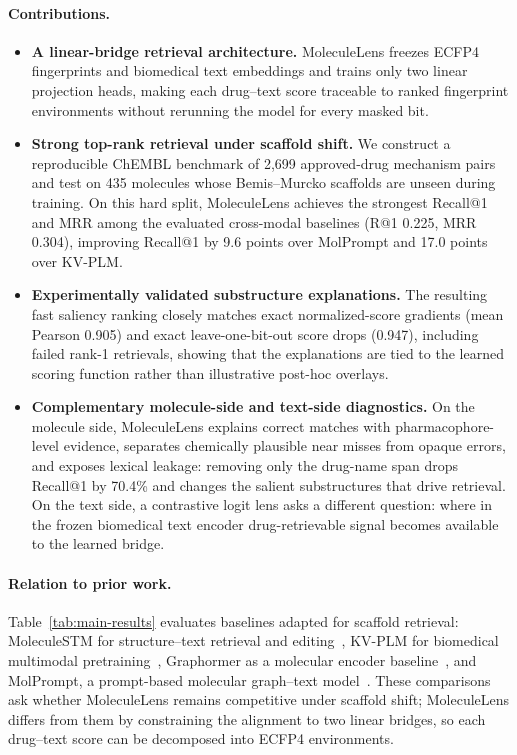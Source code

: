 \documentclass{article}
\begin{document}
\paragraph{Contributions.}
\begin{itemize}
\item \textbf{A linear-bridge retrieval architecture.} MoleculeLens freezes ECFP4 fingerprints and biomedical text embeddings and trains only two linear projection heads, making each drug--text score traceable to ranked fingerprint environments without rerunning the model for every masked bit.
\item \textbf{Strong top-rank retrieval under scaffold shift.} We construct a reproducible ChEMBL benchmark of 2,699 approved-drug mechanism pairs and test on 435 molecules whose Bemis--Murcko scaffolds are unseen during training. On this hard split, MoleculeLens achieves the strongest Recall@1 and MRR among the evaluated cross-modal baselines (R@1 0.225, MRR 0.304), improving Recall@1 by 9.6 points over MolPrompt and 17.0 points over KV-PLM.
\item \textbf{Experimentally validated substructure explanations.} The resulting fast saliency ranking closely matches exact normalized-score gradients (mean Pearson 0.905) and exact leave-one-bit-out score drops (0.947), including failed rank-1 retrievals, showing that the explanations are tied to the learned scoring function rather than illustrative post-hoc overlays.
\item \textbf{Complementary molecule-side and text-side diagnostics.} On the molecule side, MoleculeLens explains correct matches with pharmacophore-level evidence, separates chemically plausible near misses from opaque errors, and exposes lexical leakage: removing only the drug-name span drops Recall@1 by 70.4\% and changes the salient substructures that drive retrieval. On the text side, a contrastive logit lens asks a different question: where in the frozen biomedical text encoder drug-retrievable signal becomes available to the learned bridge.
\end{itemize}

\paragraph{Relation to prior work.}
Table~\ref{tab:main-results} evaluates baselines adapted for scaffold retrieval: MoleculeSTM for structure--text retrieval and editing~\citep{liu2023moleculestm}, KV-PLM for biomedical multimodal pretraining~\citep{zeng2022kvplm}, Graphormer as a molecular encoder baseline~\citep{ying2021graphormer}, and MolPrompt, a prompt-based molecular graph--text model~\citep{li2025molprompt}. These comparisons ask whether MoleculeLens remains competitive under scaffold shift; MoleculeLens differs from them by constraining the alignment to two linear bridges, so each drug--text score can be decomposed into ECFP4 environments.
\end{document}
